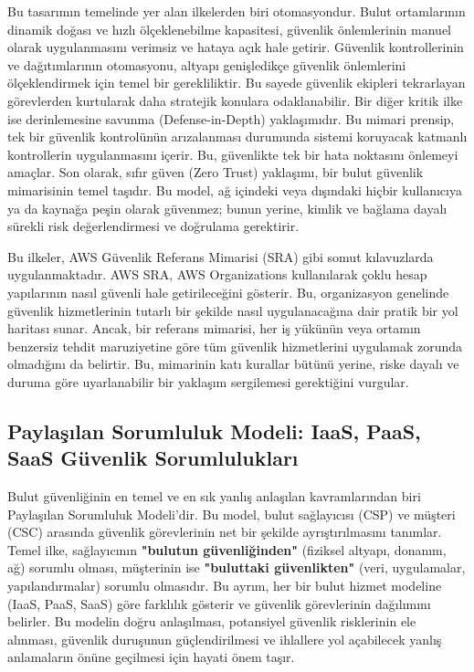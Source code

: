 Bu tasarımın temelinde yer alan ilkelerden biri otomasyondur. Bulut ortamlarının dinamik doğası ve hızlı ölçeklenebilme kapasitesi, güvenlik önlemlerinin manuel olarak uygulanmasını verimsiz ve hataya açık hale getirir. Güvenlik kontrollerinin ve dağıtımlarının otomasyonu, altyapı genişledikçe güvenlik önlemlerini ölçeklendirmek için temel bir gerekliliktir. Bu sayede güvenlik ekipleri tekrarlayan görevlerden kurtularak daha stratejik konulara odaklanabilir. Bir diğer kritik ilke ise derinlemesine savunma (Defense-in-Depth) yaklaşımıdır. Bu mimari prensip, tek bir güvenlik kontrolünün arızalanması durumunda sistemi koruyacak katmanlı kontrollerin uygulanmasını içerir. Bu, güvenlikte tek bir hata noktasını önlemeyi amaçlar. Son olarak, sıfır güven (Zero Trust) yaklaşımı, bir bulut güvenlik mimarisinin temel taşıdır. Bu model, ağ içindeki veya dışındaki hiçbir kullanıcıya ya da kaynağa peşin olarak güvenmez; bunun yerine, kimlik ve bağlama dayalı sürekli risk değerlendirmesi ve doğrulama gerektirir.

Bu ilkeler, AWS Güvenlik Referans Mimarisi (SRA) gibi somut kılavuzlarda uygulanmaktadır. AWS SRA, AWS Organizations kullanılarak çoklu hesap yapılarının nasıl güvenli hale getirileceğini gösterir. Bu, organizasyon genelinde güvenlik hizmetlerinin tutarlı bir şekilde nasıl uygulanacağına dair pratik bir yol haritası sunar. Ancak, bir referans mimarisi, her iş yükünün veya ortamın benzersiz tehdit maruziyetine göre tüm güvenlik hizmetlerini uygulamak zorunda olmadığını da belirtir. Bu, mimarinin katı kurallar bütünü yerine, riske dayalı ve duruma göre uyarlanabilir bir yaklaşım sergilemesi gerektiğini vurgular.

\subsection{Paylaşılan Sorumluluk Modeli: IaaS, PaaS, SaaS Güvenlik Sorumlulukları}

Bulut güvenliğinin en temel ve en sık yanlış anlaşılan kavramlarından biri Paylaşılan Sorumluluk Modeli'dir. Bu model, bulut sağlayıcısı (CSP) ve müşteri (CSC) arasında güvenlik görevlerinin net bir şekilde ayrıştırılmasını tanımlar. Temel ilke, sağlayıcının \textbf{"bulutun güvenliğinden"} (fiziksel altyapı, donanım, ağ) sorumlu olması, müşterinin ise \textbf{"buluttaki güvenlikten"} (veri, uygulamalar, yapılandırmalar) sorumlu olmasıdır. Bu ayrım, her bir bulut hizmet modeline (IaaS, PaaS, SaaS) göre farklılık gösterir ve güvenlik görevlerinin dağılımını belirler. Bu modelin doğru anlaşılması, potansiyel güvenlik risklerinin ele alınması, güvenlik duruşunun güçlendirilmesi ve ihlallere yol açabilecek yanlış anlamaların önüne geçilmesi için hayati önem taşır.


